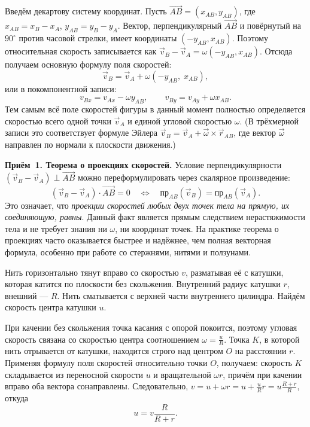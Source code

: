 \documentclass[../main.tex]{subfiles}
\begin{document}
Введём декартову систему координат. Пусть $\overrightarrow{AB} = (x_{AB}, y_{AB})$,
где $x_{AB} = x_B - x_A$, $y_{AB} = y_B - y_A$.
Вектор, перпендикулярный $\overrightarrow{AB}$ и повёрнутый на $90^\circ$
против часовой стрелки, имеет координаты $(-y_{AB}, x_{AB})$.
Поэтому относительная скорость записывается как
$\vec{v}_B - \vec{v}_A = \omega (-y_{AB}, x_{AB})$.
Отсюда получаем основную формулу поля скоростей:
\[
\vec{v}_B = \vec{v}_A + \omega (-y_{AB},\; x_{AB}),
\]
или в покомпонентной записи:
\[
v_{Bx} = v_{Ax} - \omega y_{AB}, \qquad
v_{By} = v_{Ay} + \omega x_{AB}.
\]
Тем самым всё поле скоростей фигуры в данный момент полностью определяется
скоростью всего одной точки $\vec{v}_A$ и единой угловой скоростью $\omega$.
(В трёхмерной записи это соответствует формуле Эйлера
$\vec{v}_B = \vec{v}_A + \vec{\omega} \times \vec{r}_{AB}$,
где вектор $\vec{\omega}$ направлен по нормали к плоскости движения.)

\noindent\textbf{Приём~1. Теорема о проекциях скоростей.}
Условие перпендикулярности $(\vec{v}_B - \vec{v}_A) \perp \overrightarrow{AB}$
можно переформулировать через скалярное произведение:
\[
(\vec{v}_B - \vec{v}_A) \cdot \overrightarrow{AB} = 0
\quad\Longleftrightarrow\quad
\text{пр}_{AB}(\vec{v}_B) = \text{пр}_{AB}(\vec{v}_A).
\]
Это означает, что \textit{проекции скоростей любых двух точек тела
на прямую, их соединяющую, равны}.
Данный факт является прямым следствием нерастяжимости тела
и не требует знания ни $\omega$, ни координат точек.
На практике теорема о проекциях часто оказывается быстрее
и надёжнее, чем полная векторная формула, особенно при работе
со стержнями, нитями и ползунами.

\begin{example}
Нить горизонтально тянут вправо со скоростью $v$, разматывая её
с катушки, которая катится по плоскости без скольжения.
Внутренний радиус катушки $r$, внешний --- $R$.
Нить сматывается с верхней части внутреннего цилиндра.
Найдём скорость центра катушки $u$.

При качении без скольжения точка касания с опорой покоится,
поэтому угловая скорость связана со скоростью центра соотношением
$\omega = \frac{u}{R}$. Точка $K$, в которой нить отрывается от катушки, находится
строго над центром $O$ на расстоянии $r$.
Применяя формулу поля скоростей относительно точки $O$, получаем:
скорость $K$ складывается из переносной скорости $u$ и вращательной $\omega r$,
причём при качении вправо оба вектора сонаправлены. Следовательно,
$v = u + \omega r = u + \frac{u}{R}r = u \frac{R+r}{R}$,
откуда
\[
u = v \frac{R}{R+r}.
\]
\end{example}
\end{document}
